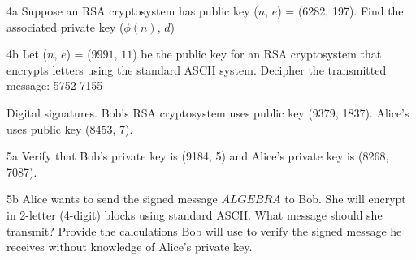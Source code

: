 

\begin{question}{4a}
Suppose an RSA cryptosystem has public key ($n$, $e$) = (6282, 197). Find the associated private key ($\phi(n)$, $d$)
\end{question}


\begin{question}{4b}
Let ($n$, $e$) = ($9991$, $11$) be the public key for an RSA cryptosystem that encrypts
letters using the standard ASCII system. Decipher the transmitted message: 5752 7155
\end{question}


\begin{question}{5}
Digital signatures. Bob's RSA cryptosystem uses public key (9379, 1837). Alice's uses
public key (8453, 7).
\end{question}


\begin{question}{5a}
Verify that Bob's private key is (9184, 5) and Alice's private key is (8268, 7087).
\end{question}


\begin{question}{5b}
Alice wants to send the signed message $ALGEBRA$ to Bob. She will encrypt in
2-letter (4-digit) blocks using standard ASCII. What message should she transmit? Provide
the calculations Bob will use to verify the signed message he receives without knowledge of
Alice's private key.
\end{question}

